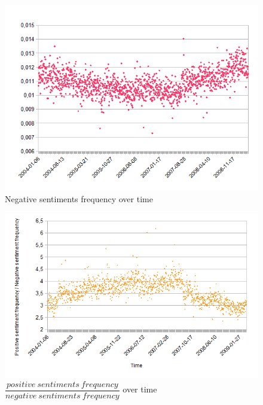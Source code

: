 \documentclass{beamer}
\begin{document}
\begin{frame}
	\begin{figure}
		\caption{Negative sentiments frequency over time}
		\includegraphics[scale=.5]{plots/time/neg.png}
	\end{figure}
\end{frame}

\begin{frame}
	\begin{figure}
		\caption{$\dfrac{positive\ sentiments\ frequency}{negative\ sentiments\ frequency}$ over time}
		\includegraphics[scale=.5]{plots/time/posdivneg.png}
	\end{figure}
\end{frame}
\end{document}
